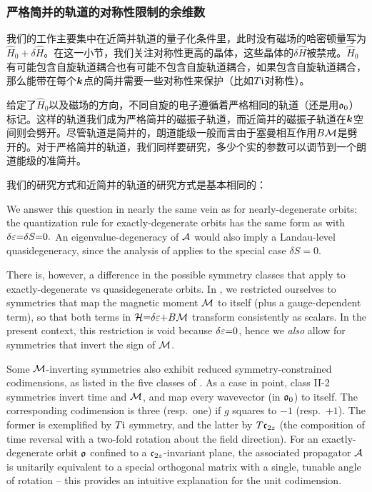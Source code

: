\subsubsection{严格简并的轨道的对称性限制的余维数}\label{sec:codimexactdeg}

我们的工作主要集中在近简并轨道的量子化条件里，此时没有磁场的哈密顿量写为$\hat{H}_0{+}\delta \hat{H}$。在这一小节，我们关注对称性更高的晶体，这些晶体的$\delta \hat{H}$被禁戒。$\hat{H}_0$有可能包含自旋轨道耦合也有可能不包含自旋轨道耦合，如果包含自旋轨道耦合，那么能带在每个$\boldsymbol{k}$点的简并需要一些对称性来保护（比如$T\mathfrak{i}$对称性）。


给定了$\hat{H}_0$以及磁场的方向，不同自旋的电子遵循着严格相同的轨道（还是用$\mathfrak{o}_0$）标记。这样的轨道我们成为严格简并的磁振子轨道，而近简并的磁振子轨道在$\boldsymbol{k}$空间则会劈开。尽管轨道是简并的，朗道能级一般而言由于塞曼相互作用$B{\cal M}$是劈开的。对于严格简并的轨道，我们同样要研究，多少个实的参数可以调节到一个朗道能级的准简并。


我们的研究方式和近简并的轨道的研究方式是基本相同的：

We answer this question in nearly the same vein as for nearly-degenerate orbits: the quantization rule for exactly-degenerate orbits\cite{topoferm} has the same form as  with $\delta \varepsilon{=}\delta S{=}0.$ An eigenvalue-degeneracy of ${\cal A}$ would also imply a Landau-level quasidegeneracy, since the analysis of  applies to the special case $\delta S{=}0$. 

There is, however, a difference in the possible symmetry classes that apply to exactly-degenerate vs quasidegenerate orbits.  In , we restricted ourselves to symmetries  that map the magnetic moment  ${\cal M}$ to itself (plus a gauge-dependent term\cite{100p}), so that both terms in ${\cal H}{=}\delta \varepsilon{+}B{\cal M}$ transform consistently as scalars. In the present context, this restriction is void because $\delta\varepsilon{=}0$, hence we \textit{also} allow for symmetries that invert the sign of ${\cal M}$. 

Some ${\cal M}$-inverting symmetries also exhibit reduced symmetry-constrained codimensions, as listed in the five classes of . As a case in point, class II-2 symmetries invert time and ${\cal M}$, and map every wavevector (in $\mathfrak{o}_0$) to itself. The corresponding codimension is three (resp.\ one) if $g$ squares to $-1$ (resp.\ $+1$). The former is exemplified by $T\mathfrak{i}$ symmetry, and the latter by $T\mathfrak{c}_{2z}$ (the composition of time reversal with a two-fold rotation about the field direction). For an exactly-degenerate orbit $\mathfrak{o}$ confined to a $\mathfrak{c}_{2z}$-invariant plane, the associated propagator ${\cal A}$ is unitarily equivalent to a special orthogonal matrix\cite{100p,alexandradinata_berry-phase_2016} with a single, tunable angle of rotation -- this provides an intuitive explanation for the unit codimension.

